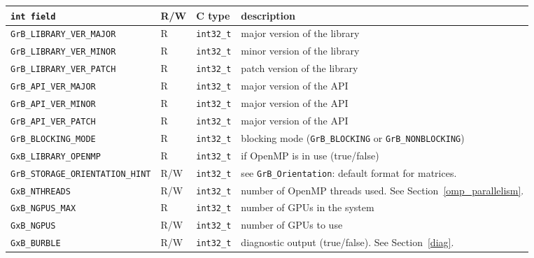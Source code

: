 \noindent
{\small
\begin{tabular}{|l|l|l|p{2.5in}|}
\hline
\verb'int field'                    & R/W  & C type        & description \\
\hline
\verb'GrB_LIBRARY_VER_MAJOR'        & R    & \verb'int32_t'& major version of the library \\
\verb'GrB_LIBRARY_VER_MINOR'        & R    & \verb'int32_t'& minor version of the library \\
\verb'GrB_LIBRARY_VER_PATCH'        & R    & \verb'int32_t'& patch version of the library \\
\verb'GrB_API_VER_MAJOR'            & R    & \verb'int32_t'& major version of the API \\
\verb'GrB_API_VER_MINOR'            & R    & \verb'int32_t'& major version of the API \\
\verb'GrB_API_VER_PATCH'            & R    & \verb'int32_t'& major version of the API \\
\verb'GrB_BLOCKING_MODE'            & R    & \verb'int32_t'& blocking mode (\verb'GrB_BLOCKING' \newline
                                                                or \verb'GrB_NONBLOCKING') \\
\verb'GxB_LIBRARY_OPENMP'           & R    & \verb'int32_t'& if OpenMP is in use (true/false) \\
\verb'GrB_STORAGE_ORIENTATION_HINT' & R/W  & \verb'int32_t'& see \verb'GrB_Orientation': default
                                                            format for matrices. \\
\verb'GxB_NTHREADS'                 & R/W  & \verb'int32_t'& number of OpenMP threads used. \newline
                                                            See Section~\ref{omp_parallelism}. \\
\verb'GxB_NGPUS_MAX'                & R    & \verb'int32_t'& number of GPUs in the system \\
\verb'GxB_NGPUS'                    & R/W  & \verb'int32_t'& number of GPUs to use \\
\verb'GxB_BURBLE'                   & R/W  & \verb'int32_t'& diagnostic output (true/false). \newline
                                                                See Section~\ref{diag}. \\

\end{tabular}}
